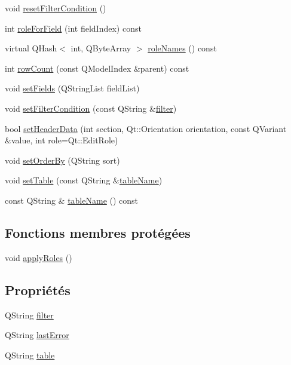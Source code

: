 \begin{DoxyCompactItemize}
\item 
void \hyperlink{classSH__SqlDataModel_a365514bffdc835545c64b2d0a67849c9}{reset\-Filter\-Condition} ()
\item 
int \hyperlink{classSH__SqlDataModel_a0e05155c3c22c6fef7b91ec57d383ae5}{role\-For\-Field} (int field\-Index) const 
\item 
virtual Q\-Hash$<$ int, Q\-Byte\-Array $>$ \hyperlink{classSH__SqlDataModel_a3f45d120bfe91faeb921b160e01a8a3f}{role\-Names} () const 
\item 
int \hyperlink{classSH__SqlDataModel_adde1b5e5e50b0bd9ca4096447c75ca15}{row\-Count} (const Q\-Model\-Index \&parent) const 
\item 
void \hyperlink{classSH__SqlDataModel_a1a345d536e6e08a03cb333351ce677af}{set\-Fields} (Q\-String\-List field\-List)
\item 
void \hyperlink{classSH__SqlDataModel_a89f54fd7a3f4288367d45d3fc17d2821}{set\-Filter\-Condition} (const Q\-String \&\hyperlink{classSH__SqlDataModel_a52d2212d201cd31ad0ebfebc1664c3ad}{filter})
\item 
bool \hyperlink{classSH__SqlDataModel_aa9ad9f29681bffdec372db4bba0aa82f}{set\-Header\-Data} (int section, Qt\-::\-Orientation orientation, const Q\-Variant \&value, int role=Qt\-::\-Edit\-Role)
\item 
void \hyperlink{classSH__SqlDataModel_a34cae2fefa659a4bfefbfb3a6328e832}{set\-Order\-By} (Q\-String sort)
\item 
void \hyperlink{classSH__SqlDataModel_a25a89526277d5ae8ebe2466dd178da8f}{set\-Table} (const Q\-String \&\hyperlink{classSH__SqlDataModel_a2497b87a0e4864f3d3e2f10f16ca19f1}{table\-Name})
\item 
const Q\-String \& \hyperlink{classSH__SqlDataModel_a2497b87a0e4864f3d3e2f10f16ca19f1}{table\-Name} () const 
\end{DoxyCompactItemize}
\subsection*{Fonctions membres protégées}
\begin{DoxyCompactItemize}
\item 
void \hyperlink{classSH__SqlDataModel_a2e529bea67d6b31d8eb4723a81a1b354}{apply\-Roles} ()
\end{DoxyCompactItemize}
\subsection*{Propriétés}
\begin{DoxyCompactItemize}
\item 
Q\-String \hyperlink{classSH__SqlDataModel_a52d2212d201cd31ad0ebfebc1664c3ad}{filter}
\item 
Q\-String \hyperlink{classSH__SqlDataModel_a43b4b2cca5c2d19fd63b2e528d6c0686}{last\-Error}
\item 
Q\-String \hyperlink{classSH__SqlDataModel_afd3e2e62c847463c5177ccad35ad4992}{table}
\end{DoxyCompactItemize}
